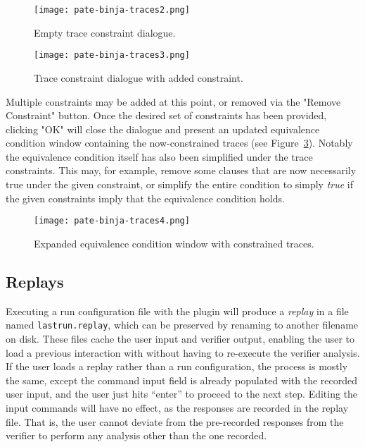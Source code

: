 \begin{figure}[h]
  \centering
  \texttt{[image: pate-binja-traces2.png]}
  \caption{Empty trace constraint dialogue.}
  \label{fig:trace-constr-empty}
\end{figure}

\begin{figure}[h]
  \centering
  \texttt{[image: pate-binja-traces3.png]}
  \caption{Trace constraint dialogue with added constraint.}
  \label{fig:trace-constr-one}
\end{figure}

Multiple constraints may be added at this point, or removed via the "Remove Constraint" button. Once the desired set of constraints
has been provided, clicking "OK" will close the dialogue and present an updated equivalence condition window containing the
now-constrained traces (see Figure~\ref{fig:equiv-cond-constrained}). Notably the equivalence condition itself has also been
simplified under the trace constraints. This may, for example, remove some clauses that are now necessarily true under the
given constraint, or simplify the entire condition to simply \emph{true} if the given constraints imply that the
equivalence condition holds.

\begin{figure}[h]
  \centering
  \texttt{[image: pate-binja-traces4.png]}
  \caption{Expanded equivalence condition window with constrained traces.}
  \label{fig:equiv-cond-constrained}
\end{figure}

\subsection{Replays}

Executing a run configuration file with the \pate{} plugin will produce a \emph{replay} in a file named \texttt{lastrun.replay}, which can be preserved by renaming to another filename on disk.
These files cache the user input and verifier output, enabling the user to load a previous interaction with \pate{} without having to re-execute the verifier analysis.
If the user loads a replay rather than a run configuration, the process is mostly the same, except the command input field is already populated with the recorded user input, and the user just hits ``enter'' to proceed to the next step.
Editing the input commands will have no effect, as the responses are recorded in the replay file.
That is, the user cannot deviate from the pre-recorded responses from the \pate{} verifier to perform any analysis other than the one recorded.

